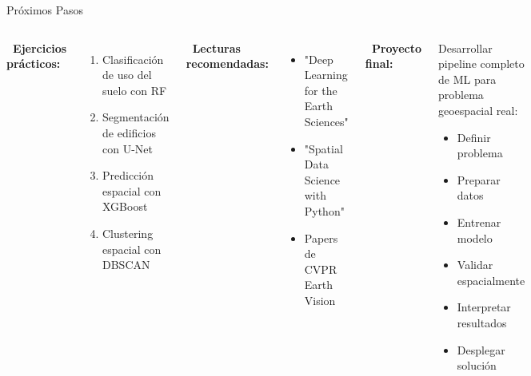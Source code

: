 \documentclass[10pt,aspectratio=169]{beamer}
\begin{document}
\begin{frame}{Próximos Pasos}
    \begin{columns}
        \textbf{\faCode\ Ejercicios prácticos:}
        \begin{enumerate}
            \item Clasificación de uso del suelo con RF
            \item Segmentación de edificios con U-Net
            \item Predicción espacial con XGBoost
            \item Clustering espacial con DBSCAN
        \end{enumerate}

        \vspace{3mm}
        \textbf{\faBookOpen\ Lecturas recomendadas:}
        \begin{itemize}
            \item "Deep Learning for the Earth Sciences"
            \item "Spatial Data Science with Python"
            \item Papers de CVPR Earth Vision
        \end{itemize}

        \textbf{\faProjectDiagram\ Proyecto final:}

        \vspace{2mm}
        \colorbox{green!20}{
            \parbox{0.9\columnwidth}{
                Desarrollar pipeline completo de ML para problema geoespacial real:
                \begin{itemize}
                    \item Definir problema
                    \item Preparar datos
                    \item Entrenar modelo
                    \item Validar espacialmente
                    \item Interpretar resultados
                    \item Desplegar solución
                \end{itemize}
            }
        }
    \end{columns}
\end{frame}
\end{document}
